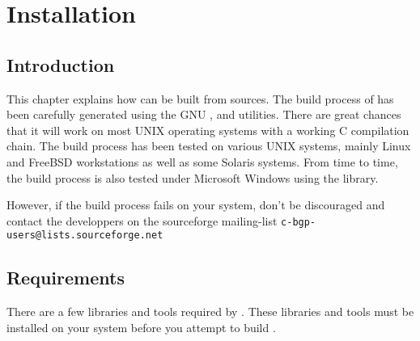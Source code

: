 \chapter{Installation}


\section{Introduction}

This chapter explains how  can be built from
sources. The build process of  has been carefully
generated using the GNU , 
and  utilities. There are great chances that it
will work on most UNIX operating systems with a working C compilation
chain. The build process has been tested on various UNIX systems,
mainly Linux and FreeBSD workstations as well as some Solaris
systems. From time to time, the build process is also tested under
Microsoft Windows using the  library.

However, if the build process fails on your system, don't be
discouraged and contact the developpers on the sourceforge
mailing-list \verb|c-bgp-users@lists.sourceforge.net|


\section{Requirements}

There are a few libraries and tools required by
. These libraries and tools must be installed on
your system before you attempt to build .


